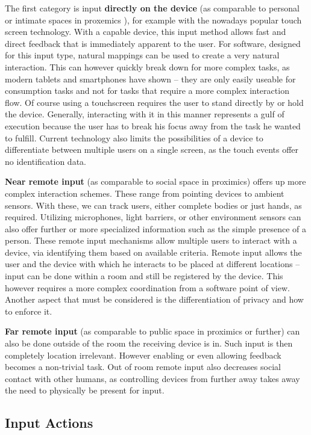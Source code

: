 The first category is input \textbf{directly on the device} (as comparable to personal or intimate spaces in proxemics \cite{}), for example with the nowadays popular touch screen technology.
With a capable device, this input method allows fast and direct feedback that is immediately apparent to the user.
For software, designed for this input type, natural mappings can be used to create a very natural interaction.
This can however quickly break down for more complex tasks, as modern tablets and smartphones have shown – they are only easily useable for consumption tasks and not for tasks that require a more complex interaction flow.
Of course using a touchscreen requires the user to stand directly by or hold the device.
Generally, interacting with it in this manner represents a gulf of execution because the user has to break his focus away from the task he wanted to fulfill.
Current technology also limits the possibilities of a device to differentiate between multiple users on a single screen, as the touch events offer no identification data.

\textbf{Near remote input} (as comparable to social space in proximics\cite{}) offers up more complex interaction schemes.
These range from pointing devices to ambient sensors.
With these, we can track users, either complete bodies or just hands, as required. Utilizing microphones, light barriers, or other environment sensors can also offer further or more specialized information such as the simple presence of a person.
These remote input mechanisms allow multiple users to interact with a device, via identifying them based on available criteria.
Remote input allows the user and the device with which he interacts to be placed at different locations – input can be done within a room and still be registered by the device.
This however requires a more complex coordination from a software point of view.
Another aspect that must be considered is the differentiation of privacy and how to enforce it.

\textbf{Far remote input} (as comparable to public space in proximics\cite{} or further) can also be done outside of the room the receiving device is in.
Such input is then completely location irrelevant.
However enabling or even allowing feedback becomes a non-trivial task.
Out of room remote input also decreases social contact with other humans, as controlling devices from further away takes away the need to physically be present for input.

\subsection{Input Actions}

